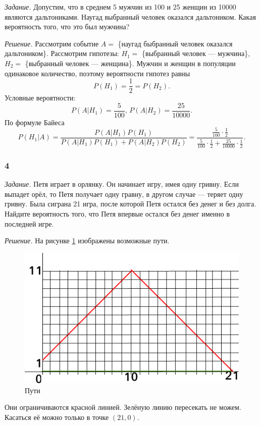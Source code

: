 \textit{Задание.} Допустим, что в среднем 5 мужчин из 100 и 25 женщин из 10000 являются дальтониками.
Наугад выбранный человек оказался дальтоником.
Какая вероятность того, что это был мужчина?

\textit{Решение.} Рассмотрим событие $A =$ \{наугад быбранный человек оказался дальтоником\}.
Рассмотрим гипотезы: $H_1 =$ \{выбранный человек --- мужчина\}, $H_2 =$ \{выбранный человек --- женщина\}.
Мужчин и женщин в популяции одинаковое количество, поэтому вероятности гипотез равны
$$P \left( H_1 \right) =
\frac{1}{2} =
P \left( H_2 \right).$$
Условные вероятности:
$$P \left( \left. A \right| H_1 \right) =
\frac{5}{100}, \,
P \left( \left. A \right| H_2 \right) =
\frac{25}{10000}.$$
По формуле Байеса
$$P \left( \left. H_1 \right| A \right) =
\frac{P \left( \left. A \right| H_1 \right) P \left( H_1 \right) }{P \left( \left. A \right| H_1 \right) P \left( H_1 \right) +
P \left( \left. A \right| H_2 \right) P \left( H_2 \right) } =
\frac{ \frac{5}{100} \cdot \frac{1}{2} }{ \frac{5}{100} \cdot \frac{1}{2} +  \frac{25}{10000} \cdot \frac{1}{2} }.$$

\subsubsection*{4}

\textit{Задание.} Петя играет в орлянку.
Он начинает игру, имея одну гривну.
Если выпадет орёл, то Петя получает одну гравну, в другом случае --- теряет одну гривну.
Была сиграна 21 игра, после которой Петя остался без денег и без долга.
Найдите вероятность того, что Петя впервые остался без денег именно в последней игре.

\textit{Решение.} На рисунке \ref{fig:14} изображены возможные пути.

\begin{figure}[h!]
  \centering
  \includegraphics[width=.4\textwidth]{./pictures/t1v1_4.png}
  \caption{Пути}
  \label{fig:14}
\end{figure}

Они ограничиваются красной линией.
Зелёную линию пересекать не можем.
Касаться её можно только в точке $ \left( 21, 0 \right) $.

